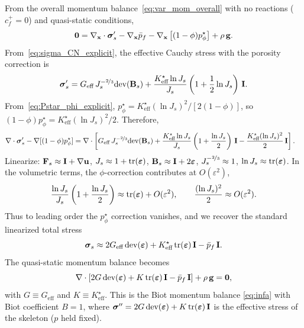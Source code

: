 \documentclass[11pt]{article}
\begin{document}
From the overall momentum balance~\eqref{eq:var_mom_overall} with no reactions ($c^+_f = 0$) and quasi-static conditions,
%
\begin{equation*}
  \mathbf{0} = \nabla_{\mathbf{x}}\cdot \boldsymbol{\sigma}'_s - \nabla_{\mathbf{x}} \bar{p}_f - \nabla_{\mathbf{x}}\left[(1-\phi)p^\star_\phi\right] + \rho\,\mathbf{g}.
\end{equation*}
%
From~\eqref{eq:sigma_CN_explicit}, the effective Cauchy stress with the porosity correction is
%
\[
  \boldsymbol{\sigma}'_s = G_{\text{eff}}\, J_s^{-\nicefrac{2}{3}}\mbox{dev}(\mathbf{B}_s) + \frac{K^\star_{\text{eff}} \ln J_s}{J_s}\left(1 + \frac{1}{2}\ln J_s\right)\,\mathbf{I}.
\]
%
From~\eqref{eq:Pstar_phi_explicit}, $p^\star_\phi = K^\star_{\text{eff}} (\ln J_s)^2 / [2(1-\phi)]$, so $(1-\phi) p^\star_\phi = K^\star_{\text{eff}} (\ln J_s)^2 / 2$.  Therefore,
%
\begin{align}
  \nabla \cdot \boldsymbol{\sigma}'_s - \nabla[(1-\phi)p^\star_\phi]
  &= \nabla \cdot \left[G_{\text{eff}}\, J_s^{-\nicefrac{2}{3}}\mbox{dev}(\mathbf{B}_s) + \frac{K^\star_{\text{eff}} \ln J_s}{J_s}\left(1 + \frac{\ln J_s}{2}\right)\,\mathbf{I} - \frac{K^\star_{\text{eff}} (\ln J_s)^2}{2}\,\mathbf{I}\right].
  \notag
\end{align}
%
Linearize: $\mathbf{F}_s \approx \mathbf{I} + \nabla\mathbf{u}$, $J_s \approx 1 + \mbox{tr}(\boldsymbol{\varepsilon})$, $\mathbf{B}_s \approx \mathbf{I} + 2\boldsymbol{\varepsilon}$, $J_s^{-\nicefrac{2}{3}} \approx 1$, $\ln J_s \approx \mbox{tr}(\boldsymbol{\varepsilon})$.  In the volumetric terms, the $\phi$-correction contributes at $O(\varepsilon^2)$,
%
\[
  \frac{\ln J_s}{J_s}\left(1 + \frac{\ln J_s}{2}\right) \approx \mbox{tr}(\boldsymbol{\varepsilon}) + O(\varepsilon^2), \qquad \frac{(\ln J_s)^2}{2} \approx O(\varepsilon^2).
\]
%
Thus to leading order the $p^\star_\phi$ correction vanishes, and we recover the standard linearized total stress
%
\begin{equation*}
  \boldsymbol{\sigma}_s \approx 2 G_{\text{eff}}\,\mbox{dev}(\boldsymbol{\varepsilon}) + K^\star_{\text{eff}}\,\mbox{tr}(\boldsymbol{\varepsilon})\,\mathbf{I} - \bar{p}_f\,\mathbf{I}.
\end{equation*}
%
The quasi-static momentum balance becomes
%
\begin{equation*}
  \nabla \cdot \left[2G\,\mbox{dev}(\boldsymbol{\varepsilon}) + K\,\mbox{tr}(\boldsymbol{\varepsilon})\,\mathbf{I} - \bar{p}_f\,\mathbf{I}\right] + \rho\,\mathbf{g} = \mathbf{0},
\end{equation*}
%
with $G \equiv G_{\text{eff}}$ and $K \equiv K^\star_{\text{eff}}$.  This is the Biot momentum balance \eqref{eq:infa} with Biot coefficient $B = 1$, where $\boldsymbol{\sigma}'' = 2G\,\mbox{dev}(\boldsymbol{\varepsilon}) + K\,\mbox{tr}(\boldsymbol{\varepsilon})\,\mathbf{I}$ is the effective stress of the skeleton ($p$ held fixed).
\end{document}
